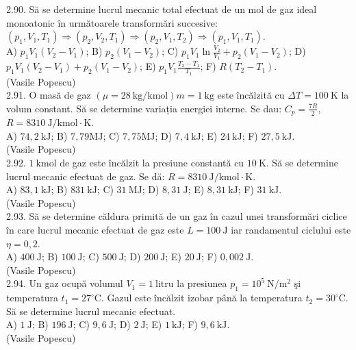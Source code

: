 2.90. Să se determine lucrul mecanic total efectuat de un mol de gaz ideal monoatonic în următoarele transformări succesive: $ \left(p_{1}, V_{1}, T_{1}\right) \Rightarrow\left(p_{2}, V_{2}, T_{1}\right) \Rightarrow\left(p_{2}, V_{1}, T_{2}\right) \Rightarrow\left(p_{1}, V_{1}, T_{1}\right)$.\\ A) $p_{1} V_{1}\left(V_{2}-V_{1}\right)$; B) $p_{2}\left(V_{1}-V_{2}\right)$; C) $p_{1} V_{1} \ln \frac{V_{2}}{V_{1}}+p_{2}\left(V_{1}-V_{2}\right)$; D) $p_{1} V_{1}\left(V_{2}-V_{1}\right)+p_{2}\left(V_{1}-V_{2}\right)$; E) $p_{1} V_{1} \frac{T_{2}-T_{1}}{T_{1}}$; F) $R\left(T_{2}-T_{1}\right)$.\\ (Vasile Popescu)\\

2.91. O masă de gaz $(\mu=28 \mathrm{~kg} / \mathrm{kmol}) m=1 \mathrm{~kg}$ este încălzită cu $\Delta T=100 \mathrm{~K}$ la volum constant. Să se determine variația energiei interne. Se dau: $C_{p}=\frac{7 R}{2}$, $R=8310 \mathrm{~J} / \mathrm{kmol} \cdot \mathrm{K}$.\\ A) $74,2 \mathrm{~kJ}$; B) $7,79 \mathrm{MJ}$; C) $7,75 \mathrm{MJ}$; D) $7,4 \mathrm{~kJ}$; E) $24 \mathrm{~kJ}$; F) $27,5 \mathrm{~kJ}$.\\ (Vasile Popescu)\\

2.92. $1 \mathrm{~kmol}$ de gaz este încălzit la presiune constantă cu $10 \mathrm{~K}$. Să se determine lucrul mecanic efectuat de gaz. Se dă: $R=8310 \mathrm{~J} / \mathrm{kmol} \cdot \mathrm{K}$.\\ A) $83,1 \mathrm{~kJ}$; B) $831 \mathrm{~kJ}$; C) $31 \mathrm{~MJ}$; D) $8,31 \mathrm{~J}$; E) $8,31 \mathrm{~kJ}$; F) $31 \mathrm{~kJ}$.\\ (Vasile Popescu)\\

2.93. Să se determine căldura primită de un gaz în cazul unei transformări ciclice în care lucrul mecanic efectuat de gaz este $L=100 \mathrm{~J}$ iar randamentul ciclului este $\eta=0,2$.\\ A) $400 \mathrm{~J}$; B) $100 \mathrm{~J}$; C) $500 \mathrm{~J}$; D) $200 \mathrm{~J}$; E) $20 \mathrm{~J}$; F) $0,002 \mathrm{~J}$.\\ (Vasile Popescu)\\

2.94. Un gaz ocupă volumul $V_{1}=1 \mathrm{~litru}$ la presiunea $p_{1}=10^{5} \mathrm{~N} / \mathrm{m}^{2}$ şi temperatura $t_{1}=27^{\circ} \mathrm{C}$. Gazul este încălzit izobar până la temperatura $t_{2}=30^{\circ} \mathrm{C}$. Să se determine lucrul mecanic efectuat.\\ A) $1 \mathrm{~J}$; B) $196 \mathrm{~J}$; C) $9,6 \mathrm{~J}$; D) $2 \mathrm{~J}$; E) $1 \mathrm{~kJ}$; F) $9,6 \mathrm{~kJ}$.\\ (Vasile Popescu)\\

